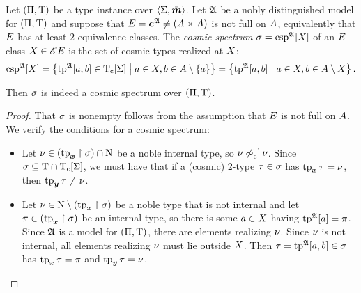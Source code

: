 \begin{definition}
Let $(\Pi,\mathrm{T})$ be a type instance over $\left\langle \mathrm{\Sigma},\bar{\bm{m}} \right\rangle$.
Let $\mathfrak{A}$ be a nobly distinguished model for $(\Pi,\mathrm{T})$ and suppose that
$E = \bm{e}^{\mathfrak{A}} \neq ({A\times A})$ is not full on $A$, equivalently that $E$ has at least
$2$ equivalence classes.
The \emph{cosmic spectrum} $\sigma = \operatorname{csp}^{\mathfrak{A}}[X]$ of an $E$-class
$X \in {\mathscr{E}E}$ is the set of cosmic types realized at $X$:
\[
  \operatorname{csp}^{\mathfrak{A}}[X] = \left\{\operatorname{tp}^{\mathfrak{A}}[a,b] \in \mathrm{T}_{\mathrm{c}}[\mathrm{\Sigma}]\mathrel{}\middle|\mathrel{}a\in X, b 
  \in A\setminus\left\{a\right\}\right\} = \left\{\operatorname{tp}^{\mathfrak{A}}[a,b]\mathrel{}\middle|\mathrel{}a \in X, b \in
  A \setminus X\right\}.
\]
\end{definition}
\begin{remark}
Then $\sigma$ is indeed a cosmic spectrum over $(\Pi,\mathrm{T})$.
\end{remark}
\begin{proof}
That $\sigma$ is nonempty follows from the assumption that $E$ is not full on
$A$. We verify the conditions for a cosmic spectrum:
\begin{itemize}
  \item[\refcondcspnx]
   Let $\nu \in (\operatorname{tp}_{\bm{x}}\restriction\sigma) \cap \mathrm{\mathrm{N}}$ be a noble internal type,
   so $\nu \not\sim_{\mathrm{c}}^{\mathrm{T}} \nu$. Since $\sigma \subseteq \mathrm{T} \cap
   \mathrm{T}_{\mathrm{c}}[\mathrm{\Sigma}]$, we must have that if a (cosmic) $2$-type $\tau \in \sigma$ has
   $\operatorname{tp}_{\bm{x}}\tau = \nu$, then $\operatorname{tp}_{\bm{y}}\tau \neq \nu$.
   \item[\refcondcspny]
   Let $\nu \in \mathrm{\mathrm{N}} \setminus (\operatorname{tp}_{\bm{x}}\restriction\sigma)$ be a noble type that is not
   internal and let $\pi \in (\operatorname{tp}_{\bm{x}}\restriction\sigma)$ be an internal type, so
   there is some $a \in X$ having $\operatorname{tp}^{\mathfrak{A}}[a] = \pi$.
   Since $\mathfrak{A}$ is a model for $(\Pi,\mathrm{T})$, there are elements realizing
   $\nu$. Since $\nu$ is not internal, all elements realizing $\nu$ must
   lie outside $X$. Then $\tau = \operatorname{tp}^{\mathfrak{A}}[a,b] \in \sigma$ has
   $\operatorname{tp}_{\bm{x}}\tau = \pi$ and $\operatorname{tp}_{\bm{y}}\tau = \nu$.
\end{itemize}
\end{proof}


